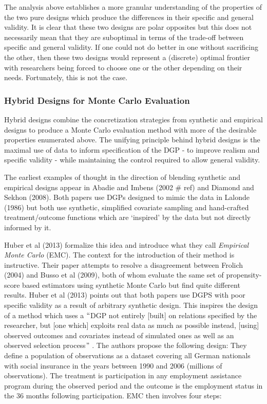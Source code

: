\documentclass[../main.tex]{subfiles}
\begin{document}
The analysis above establishes a more granular understanding of the properties of the two pure designs which produce the differences in their specific and general validity. It is clear that these two designs are polar opposites but this does not necessarily mean that they are suboptimal in terms of the trade-off between specific and general validity. If one could not do better in one without sacrificing the other, then these two designs would represent a (discrete) optimal frontier with researchers being forced to choose one or the other depending on their needs. Fortunately, this is not the case.

\subsubsection{Hybrid Designs for Monte Carlo Evaluation}

Hybrid designs combine the concretization strategies from synthetic and empirical designs to produce a Monte Carlo evaluation method with more of the desirable properties enumerated above. The unifying principle behind hybrid designs is the maximal use of data to inform specification of the DGP - to improve realism and specific validity - while maintaining the control required to allow general validity.\par


\vspace{\baselineskip}
The earliest examples of thought in the direction of blending synthetic and empirical designs appear in Abadie and Imbens (2002 $\#$ ref) and Diamond and Sekhon (2008). Both papers use DGPs designed to mimic the data in Lalonde (1986) but both use synthetic, simplified covariate sampling and hand-crafted treatment/outcome functions which are ‘inspired’ by the data but not directly informed by it.\par


\vspace{\baselineskip}
Huber et al (2013) formalize this idea and introduce what they call \textit{Empirical Monte Carlo }(EMC). The context for the introduction of their method is instructive. Their paper attempts to resolve a disagreement between Frolich (2004) and Busso et al (2009), both of whom evaluate the same set of propensity-score based estimators using synthetic Monte Carlo but find quite different results. Huber et al (2013) points out that both papers use DGPS with poor specific validity as a result of arbitrary synthetic design. This inspires the design of a method which uses a $``$DGP not entirely [built] on relations specified by the researcher, but [one which] exploits real data as much as possible instead, [using] observed outcomes and covariates instead of simulated ones as well as an observed selection process$"$ . The authors propose the following design: They define a population of observations as a dataset covering all German nationals with social insurance in the years between 1990 and 2006 (millions of observations). The treatment is participation in any employment assistance program during the observed period and the outcome is the employment status in the 36 months following participation. EMC then involves four steps: \par
\end{document}
